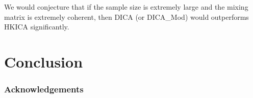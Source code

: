 \documentclass[twoside]{article}
\theoremstyle{definition}
\begin{document}
We would conjecture that if the sample size is extremely large and the mixing matrix is extremely coherent, then DICA (or DICA\_Mod) would outperforms HKICA significantly.
\fi 
\section{Conclusion}



\subsubsection*{Acknowledgements}






\end{document}
